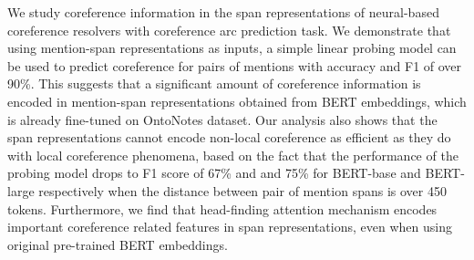 \documentclass[11pt]{article}
\begin{document}
\begin{itemize}
 

\end{itemize}


We study coreference information in the span representations of neural-based coreference resolvers with coreference arc prediction task. We demonstrate that using mention-span representations as inputs, a simple linear probing model can be used to predict coreference for pairs of mentions with accuracy and F1 of over 90\%. This suggests that a significant amount of coreference information is encoded in mention-span representations obtained from BERT embeddings, which is already fine-tuned on OntoNotes dataset. Our analysis also shows that the span representations cannot encode non-local coreference as efficient as they do with local coreference phenomena, based on the fact that the performance of the probing model drops to F1 score of 67\% and and 75\% for BERT-base and BERT-large respectively when the distance between pair of mention spans is over 450 tokens. Furthermore, we find that head-finding attention mechanism encodes important coreference related features in span representations, even when using original pre-trained BERT embeddings.
\end{document}
